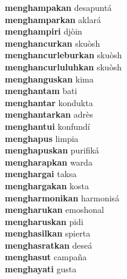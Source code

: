 \textbf{menghampakan } desapuntá \\
\textbf{menghamparkan } aklará \\
\textbf{menghampiri } djòin \\
\textbf{menghancurkan } skuòsh \\
\textbf{menghancurleburkan } skuòsh \\
\textbf{menghancurluluhkan } skuòsh \\
\textbf{menghanguskan } kima \\
\textbf{menghantam } bati \\
\textbf{menghantar } kondukta \\
\textbf{menghantarkan } adrès \\
\textbf{menghantui } konfundí \\
\textbf{menghapus } limpia \\
\textbf{menghapuskan } purifiká \\
\textbf{mengharapkan } warda \\
\textbf{menghargai } taksa \\
\textbf{menghargakan } kosta \\
\textbf{mengharmonikan } harmonisá \\
\textbf{mengharukan } emoshonal \\
\textbf{mengharuskan } pidi \\
\textbf{menghasilkan } spierta \\
\textbf{menghasratkan } deseá \\
\textbf{menghasut } campaña \\
\textbf{menghayati } gusta \\
